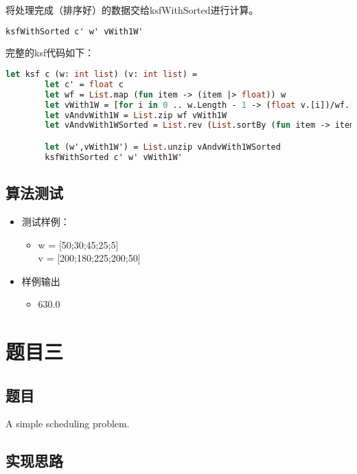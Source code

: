 \documentclass[a4paper]{article}
\begin{document}
将处理完成（排序好）的数据交给ksfWithSorted进行计算。
\begin{lstlisting}[language=ML]
        ksfWithSorted c' w' vWith1W'
\end{lstlisting}

完整的ksf代码如下：
\begin{lstlisting}[language=ML]
    let ksf c (w: int list) (v: int list) =
        let c' = float c
        let wf = List.map (fun item -> (item |> float)) w
        let vWith1W = [for i in 0 .. w.Length - 1 -> (float v.[i])/wf.[i]]
        let vAndvWith1W = List.zip wf vWith1W
        let vAndvWith1WSorted = List.rev (List.sortBy (fun item -> item |> snd) vAndvWith1W)

        let (w',vWith1W') = List.unzip vAndvWith1WSorted
        ksfWithSorted c' w' vWith1W'
\end{lstlisting}

\subsection{算法测试}

\begin{itemize}
\item
    测试样例：
    \begin{itemize}
    \item
        w = [50;30;45;25;5] \\
        v = [200;180;225;200;50]
    \end{itemize}
\item
    样例输出
    \begin{itemize}
    \item
        630.0
    \end{itemize}
\end{itemize}

\section{题目三}

\subsection{题目}

A simple scheduling problem.

\subsection{实现思路}
\end{document}
